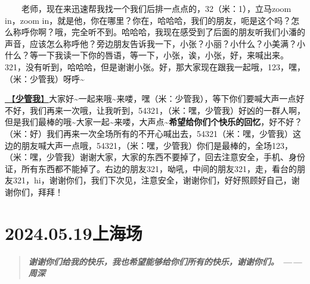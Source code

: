 \documentclass[]{ctexbook}
\begin{document}
  老师，现在来迅速帮我找一个我们后排一点点的，32（米：1），立马zoom in，zoom in，就是他，你在哪里？你在，哈哈哈，我们的朋友，呃是这个吗？怎么称呼你啊？哦，完全听不到。哈哈哈，我现在感受到了后面的朋友听我们小潘的声音，应该怎么称呼他？旁边朋友告诉我一下，小张？小丽？小什么？小美满？小什么？等一下我读一下你的唇语，等一下，小张，诶，小张，好，来喊出来。321，没有听到，哈哈哈，但是谢谢小张。好，那大家现在跟我一起哦，123，嘿，（米：少管我）呀呼\textasciitilde{}

\hyperref[watch-ur-manners]{🎵【\textbf{少管我}】}大家好\textasciitilde 一起来哦\textasciitilde 来喽，嘿（米：少管我），等下你们要喊大声一点好不好，我们再来一次哦，让我听到，54321，（米：嘿，少管我）好凶的一群人啊，但是我们最棒的哦\textasciitilde 大家一起\textasciitilde 来喽，大声点\textasciitilde{}\textbf{希望给你们个快乐的回忆}，好不好？（米：好）我们再来一次全场所有的不开心喊出去，54321（米：嘿，少管我）这边的朋友喊大声一点哦，54321，（米：嘿，少管我）你们是最棒的，全场123，（米：嘿，少管我）谢谢大家，大家的东西不要掉了，回去注意安全，手机、身份证，所有东西都不能掉了。右边的朋友321，呦吼，中间的朋友321，走，看台的朋友321，hi，谢谢你们，我们下次见，注意安全，谢谢你们，好好照顾好自己，谢谢你们，拜拜！

\chapter{2024.05.19上海场}\label{shanghai-20240519}

\begin{quote}
\textbf{\emph{谢谢你们给我的快乐，我也希望能够给你们所有的快乐，谢谢你们。 ------ 周深}}
\end{quote}
\end{document}
